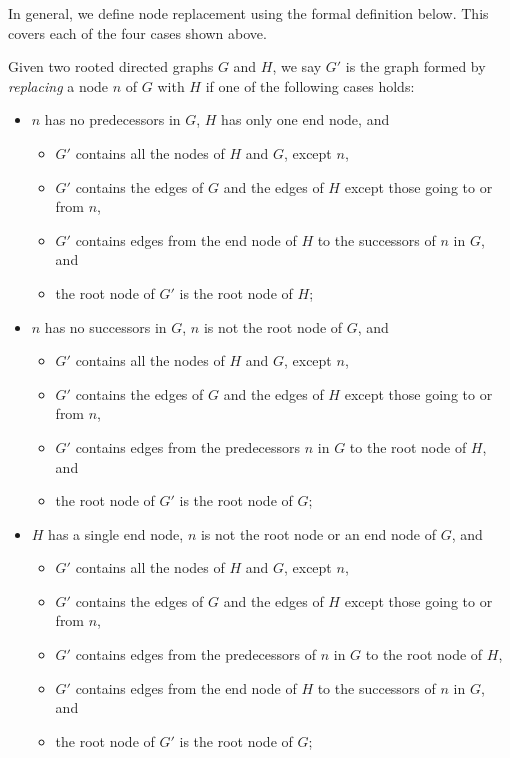 In general, we define node replacement using the formal definition
below.
This covers each of the four cases shown above.
\begin{defn}
  Given two rooted directed graphs $G$ and $H$, we say $G'$ is the
  graph formed by \emph{replacing} a node $n$ of $G$ with $H$ if one
  of the following cases holds:
  \begin{itemize}
  \item $n$ has no predecessors in $G$, $H$ has only one end node, and
    \begin{itemize}
    \item $G'$ contains all the nodes of $H$ and $G$, except $n$,
    \item $G'$ contains the edges of $G$ and the edges of $H$ except
      those going to or from $n$,
    \item $G'$ contains edges from the end node of $H$ to the
      successors of $n$ in $G$, and
    \item the root node of $G'$ is the root node of $H$;
    \end{itemize}
  \item $n$ has no successors in $G$, $n$ is not the root node of $G$, and
    \begin{itemize}
    \item $G'$ contains all the nodes of $H$ and $G$, except $n$,
    \item $G'$ contains the edges of $G$ and the edges of $H$ except
      those going to or from $n$,
    \item $G'$ contains edges from the predecessors $n$ in $G$ to the
      root node of $H$, and
    \item the root node of $G'$ is the root node of $G$;
    \end{itemize}
  \item $H$ has a single end node, $n$ is not the root node or an end
    node of $G$, and
    \begin{itemize}
    \item $G'$ contains all the nodes of $H$ and $G$, except $n$,
    \item $G'$ contains the edges of $G$ and the edges of $H$ except
      those going to or from $n$,
    \item $G'$ contains edges from the predecessors of $n$ in $G$ to
      the root node of $H$,
    \item $G'$ contains edges from the end node of $H$ to the
      successors of $n$ in $G$, and
    \item the root node of $G'$ is the root node of $G$;

\end{itemize}
\end{itemize}
\end{defn}
